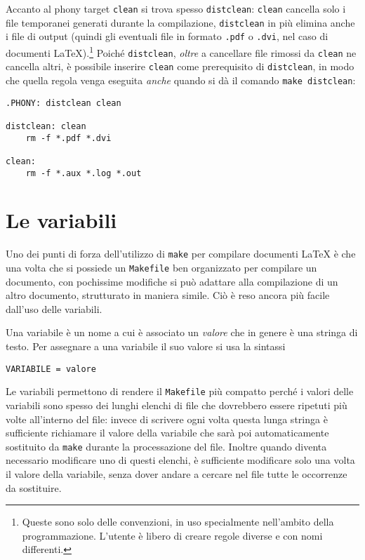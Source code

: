 Accanto al phony target \verb|clean| si trova spesso \verb|distclean|:
\verb|clean| cancella solo i file temporanei generati durante la compilazione,
\verb|distclean| in più elimina anche i file di output (quindi gli eventuali
file in formato \verb|.pdf| o \verb|.dvi|, nel caso di documenti
\LaTeX).\footnote{Queste sono solo delle convenzioni, in uso specialmente
  nell'ambito della programmazione.  L'utente è libero di creare regole diverse
  e con nomi differenti.}
Poiché \verb|distclean|, \emph{oltre} a cancellare file rimossi da \verb|clean|
ne cancella altri, è possibile inserire \verb|clean| come prerequisito di
\verb|distclean|, in modo che quella regola venga eseguita \emph{anche} quando
si dà il comando \verb|make distclean|:
\begin{lstlisting}[caption={Phony target \texttt{distclean} e \texttt{clean}.},
label=lst:distclean]
.PHONY: distclean clean

distclean: clean
	rm -f *.pdf *.dvi

clean:
	rm -f *.aux *.log *.out
\end{lstlisting}


\section{Le variabili}
\label{sec:variabili}

Uno dei punti di forza dell'utilizzo di \verb|make| per compilare documenti
\LaTeX{}
è che una volta che si possiede un \verb|Makefile| ben organizzato per compilare
un documento, con pochissime modifiche si può adattare alla compilazione di un
altro documento, strutturato in maniera simile.  Ciò è reso ancora più facile
dall'uso delle variabili.

Una variabile è un nome a cui è associato un \emph{valore} che in genere è una
stringa di testo.  Per assegnare a una variabile il suo valore si usa la
sintassi
\begin{lstlisting}
VARIABILE = valore
\end{lstlisting}
Le variabili permettono di rendere il \verb|Makefile| più compatto perché i
valori delle variabili sono spesso dei lunghi elenchi di file che dovrebbero
essere ripetuti più volte all'interno del file: invece di scrivere ogni volta
questa lunga stringa è sufficiente richiamare il valore della variabile che sarà
poi automaticamente sostituito da \verb|make| durante la processazione del file.
Inoltre quando diventa necessario modificare uno di questi elenchi, è
sufficiente modificare solo una volta il valore della variabile, senza dover
andare a cercare nel file tutte le occorrenze da sostituire.


